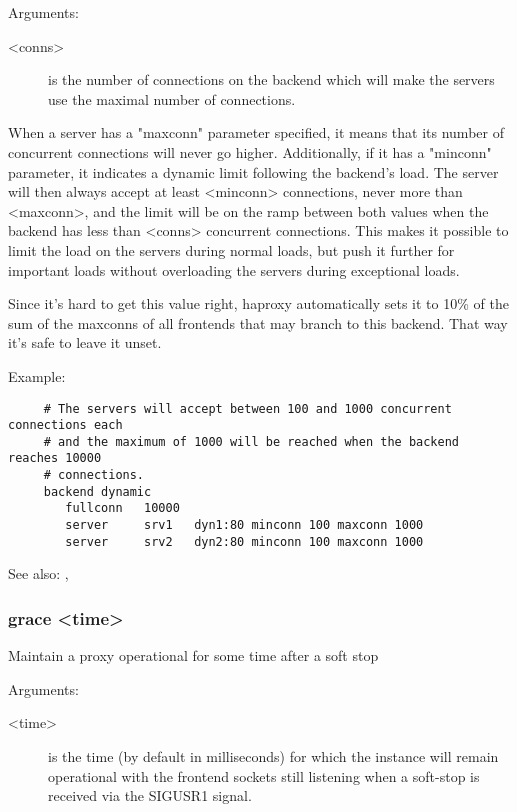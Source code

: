   
  Arguments:
  \begin{description}
  \item[<conns>]   is the number of connections on the backend which will make the
              servers use the maximal number of connections.
  \end{description}

  When a server has a "maxconn" parameter specified, it means that its number
  of concurrent connections will never go higher. Additionally, if it has a
  "minconn" parameter, it indicates a dynamic limit following the backend's
  load. The server will then always accept at least <minconn> connections,
  never more than <maxconn>, and the limit will be on the ramp between both
  values when the backend has less than <conns> concurrent connections. This
  makes it possible to limit the load on the servers during normal loads, but
  push it further for important loads without overloading the servers during
  exceptional loads.

  Since it's hard to get this value right, haproxy automatically sets it to
  10\% of the sum of the maxconns of all frontends that may branch to this
  backend. That way it's safe to leave it unset.

  Example:
  
  \begin{verbatim}
     # The servers will accept between 100 and 1000 concurrent connections each
     # and the maximum of 1000 will be reached when the backend reaches 10000
     # connections.
     backend dynamic
        fullconn   10000
        server     srv1   dyn1:80 minconn 100 maxconn 1000
        server     srv2   dyn2:80 minconn 100 maxconn 1000
  \end{verbatim}

  See also: , 

\subsubsection[grace]{grace <time>}
  Maintain a proxy operational for some time after a soft stop
  
  
  Arguments:
  \begin{description}
  \item[<time>]    is the time (by default in milliseconds) for which the instance
              will remain operational with the frontend sockets still listening
              when a soft-stop is received via the SIGUSR1 signal.
  \end{description}

